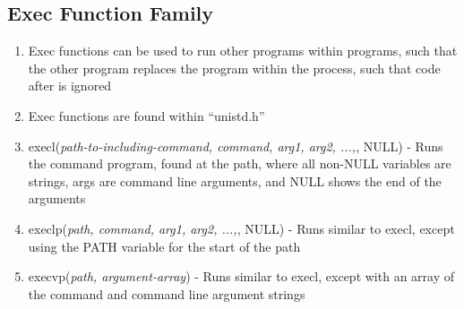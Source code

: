 \documentclass[11 pt, twoside]{article}
\begin{document}
\subsection{Exec Function Family}
\begin{enumerate}
\item Exec functions can be used to run other programs within programs, such that the other program replaces the program within the process, such that code after is ignored
\item Exec functions are found within ``unistd.h''
\item execl(\textit{path-to-including-command, command, arg1, arg2, ...,}, NULL) - Runs the command program, found at the path,  where all non-NULL variables are strings, args are command line arguments, and NULL shows the end of the arguments
\item execlp(\textit{path, command, arg1, arg2, ...,}, NULL) - Runs similar to execl, except using the PATH variable for the start of the path
\item execvp(\textit{path, argument-array}) - Runs similar to execl, except with an array of the command and command line argument strings
\end{enumerate}
\end{document}
